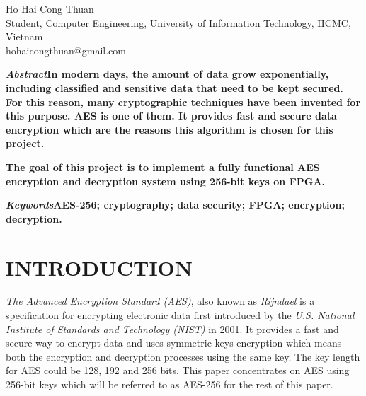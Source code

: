 \documentclass[a4paper, 10pt]{article}
\begin{document}
    \title{}
    \author{}
    \maketitle %

    \begin{center}
        Ho Hai Cong Thuan\\
        Student, Computer Engineering, University of Information Technology, HCMC, Vietnam\\
        hohaicongthuan@gmail.com
    \end{center}
    \begin{multicols}{2}
        
        \textbf{\textit{Abstract\textemdash}In modern days, the amount of data grow exponentially, including classified and sensitive data that need to be kept secured. For this reason, many cryptographic techniques have been invented for this purpose. AES is one of them. It provides fast and secure data encryption which are the reasons this algorithm is chosen for this project.}

        \textbf{The goal of this project is to implement a fully functional AES encryption and decryption system using 256-bit keys on FPGA.}
        
        \bigskip

        \textbf{\textit{Keywords\textemdash}AES-256; cryptography; data security; FPGA; encryption; decryption.}

        \section{INTRODUCTION}
            \textit{The Advanced Encryption Standard (AES)}, also known as \textit{Rijndael} is a specification for encrypting electronic data first introduced by the \textit{U.S. National Institute of Standards and Technology (NIST)} in 2001. It provides a fast and secure way to encrypt data and uses symmetric keys encryption which means both the encryption and decryption processes using the same key. The key length for AES could be 128, 192 and 256 bits. This paper concentrates on AES using 256-bit keys which will be referred to as AES-256 for the rest of this paper.
            

\end{multicols}
\end{document}
